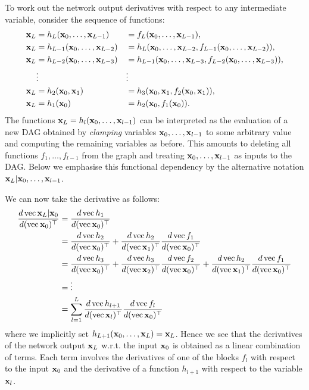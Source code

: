 To work out the network output derivatives with respect to any intermediate variable, consider the sequence of functions:
\[
\begin{aligned}
  \mathbf{x}_L &= h_L(\mathbf{x}_0,\dots,\mathbf{x}_{L-1}) &&= f_L(\mathbf{x}_0,\dots,\mathbf{x}_{L-1}),
\\
  \mathbf{x}_L &= h_{L-1}(\mathbf{x}_0,\dots,\mathbf{x}_{L-2}) &&= h_L(\mathbf{x}_0,\dots,\mathbf{x}_{L-2},f_{L-1}(\mathbf{x}_0,\dots,\mathbf{x}_{L-2})),
 \\
  \mathbf{x}_L &= h_{L-2}(\mathbf{x}_0,\dots,\mathbf{x}_{L-3}) &&= h_{L-1}(\mathbf{x}_0,\dots,\mathbf{x}_{L-3},f_{L-2}(\mathbf{x}_0,\dots,\mathbf{x}_{L-3})),
  \\
  &\vdots &&\vdots
  \\
  \mathbf{x}_L &= h_2(\mathbf{x}_0,\mathbf{x}_1) &&= h_3(\mathbf{x}_0,\mathbf{x}_1,f_2(\mathbf{x}_0,\mathbf{x}_1)),
  \\
  \mathbf{x}_L &= h_1(\mathbf{x}_0)  &&= h_2(\mathbf{x}_0, f_1(\mathbf{x}_0)).
  \end{aligned}
\]
The functions $\mathbf{x}_L= h_l(\mathbf{x}_0,\dots,\mathbf{x}_{l-1})$ can be interpreted as the evaluation of a new DAG obtained by \emph{clamping} variables $\mathbf{x}_0,\dots,\mathbf{x}_{l-1}$ to some arbitrary value and computing the remaining variables as before. This amounts to deleting all functions $f_1,\dots,f_{l-1}$ from the graph and treating $\mathbf{x}_0,\dots,\mathbf{x}_{l-1}$ as inputs to the DAG. Below we emphasise this functional dependency by the alternative notation $\mathbf{x}_L|\mathbf{x}_0,\dots,\mathbf{x}_{l-1}$.

We can now take the derivative as follows:
\begin{align*}
\frac{d \operatorname{vec} \mathbf{x}_L | \mathbf{x}_0}{d(\operatorname{vec} \mathbf{x}_0)^\top}
&=
\frac{d\operatorname{vec} h_1}{d(\operatorname{vec} \mathbf{x}_0)^\top} \\
&=
\frac{d\operatorname{vec} h_2}{d(\operatorname{vec} \mathbf{x}_0)^\top} +
\frac{d\operatorname{vec} h_2}{d(\operatorname{vec} \mathbf{x}_1)^\top} \frac{d\operatorname{vec} f_1}{d(\operatorname{vec} \mathbf{x}_0)^\top}
\\
&=
\frac{d\operatorname{vec} h_3}{d(\operatorname{vec} \mathbf{x}_0)^\top} +
\frac{d\operatorname{vec} h_3}{d(\operatorname{vec} \mathbf{x}_2)^\top} \frac{d\operatorname{vec} f_2}{d(\operatorname{vec} \mathbf{x}_0)^\top} +
\frac{d\operatorname{vec} h_2}{d(\operatorname{vec} \mathbf{x}_1)^\top} \frac{d\operatorname{vec} f_1}{d(\operatorname{vec} \mathbf{x}_0)^\top}
\\
&=
\vdots
\\
&=
\sum_{l=1}^L
\frac{d\operatorname{vec} h_{l+1}}{d(\operatorname{vec} \mathbf{x}_l)^\top}
\frac{d\operatorname{vec} f_l}{d(\operatorname{vec} \mathbf{x}_0)^\top}
\end{align*}
where we implicitly set $h_{L+1}(\mathbf{x}_0,\dots,\mathbf{x}_L) = \mathbf{x}_L$. Hence we see that the derivatives of the network output $\mathbf{x}_L$ w.r.t. the input $\mathbf{x}_0$ is obtained as a linear combination of terms. Each term involves the derivatives of one of the blocks $f_l$ with respect to the input $\mathbf{x}_0$ and the derivative of a function $h_{l+1}$ with respect to the variable $\mathbf{x}_l$.

